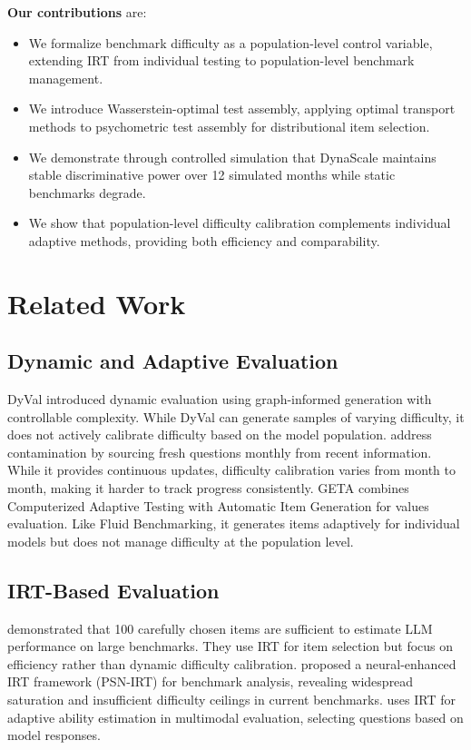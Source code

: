 \documentclass{article}
\begin{document}
\textbf{Our contributions} are:
\begin{itemize}
    \item We formalize benchmark difficulty as a population-level control variable, extending IRT from individual testing to population-level benchmark management.
    \item We introduce Wasserstein-optimal test assembly, applying optimal transport methods to psychometric test assembly for distributional item selection.
    \item We demonstrate through controlled simulation that DynaScale maintains stable discriminative power over 12 simulated months while static benchmarks degrade.
    \item We show that population-level difficulty calibration complements individual adaptive methods, providing both efficiency and comparability.
\end{itemize}

\section{Related Work}
\label{sec:related}

\subsection{Dynamic and Adaptive Evaluation}

DyVal \citep{zhu2024dyval} introduced dynamic evaluation using graph-informed generation with controllable complexity. While DyVal can generate samples of varying difficulty, it does not actively calibrate difficulty based on the model population. \citet{white2025livebench} address contamination by sourcing fresh questions monthly from recent information. While it provides continuous updates, difficulty calibration varies from month to month, making it harder to track progress consistently. GETA \citep{jiang2025raising} combines Computerized Adaptive Testing with Automatic Item Generation for values evaluation. Like Fluid Benchmarking, it generates items adaptively for individual models but does not manage difficulty at the population level.

\subsection{IRT-Based Evaluation}

\citet{polo2024tinybenchmarks} demonstrated that 100 carefully chosen items are sufficient to estimate LLM performance on large benchmarks. They use IRT for item selection but focus on efficiency rather than dynamic difficulty calibration. \citet{zhou2025lost} proposed a neural-enhanced IRT framework (PSN-IRT) for benchmark analysis, revealing widespread saturation and insufficient difficulty ceilings in current benchmarks. \citet{ding2025autojudger} uses IRT for adaptive ability estimation in multimodal evaluation, selecting questions based on model responses.
\end{document}
